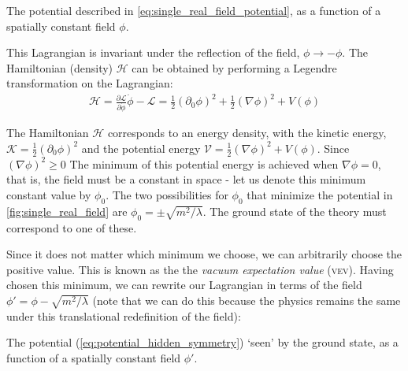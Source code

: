 \begin{marginfigure}
\caption{The potential described in \autoref{eq:single_real_field_potential}, as a function of a spatially constant field $\phi$.}
\label{fig:single_real_field}
\end{marginfigure}

This Lagrangian is invariant under the reflection of the field, $\phi\rightarrow -\phi$. The Hamiltonian (density) $\mathcal{H}$ can be obtained by performing a Legendre transformation on the Lagrangian:
\begin{align}
\mathcal{H} = \frac{\partial\mathcal{L}}{\partial\dot{\phi}}\dot{\phi} - \mathcal{L} = \frac{1}{2}(\partial_0\phi)^2+ \frac{1}{2}(\nabla\phi)^2+ V(\phi)
\end{align}

The Hamiltonian $\mathcal{H}$ corresponds to an energy density, with the kinetic energy, $\mathcal{K} = \frac{1}{2}(\partial_0\phi)^2$ and the potential energy $\mathcal{V} = \frac{1}{2}(\nabla\phi)^2 + V(\phi)$. Since $(\nabla\phi)^2 \geq 0$ The minimum of this potential energy is achieved when $\nabla\phi = 0$, that is, the field must be a constant in space - let us denote this minimum constant value by $\phi_0$. The two possibilities for $\phi_0$ that minimize the potential in \autoref{fig:single_real_field} are $\phi_0 = \pm\sqrt{m^2/\lambda}$. The ground state of the theory must correspond to one of these.

Since it does not matter which minimum we choose, we can arbitrarily choose the positive value. This is known as the the \emph{vacuum expectation value} (\textsc{vev}). Having chosen this minimum, we can rewrite our Lagrangian in terms of the field $\phi' = \phi - \sqrt{m^2/\lambda}$ (note that we can do this because the physics remains the same under this translational redefinition of the field):
\begin{marginfigure}
\caption{The potential (\autoref{eq:potential_hidden_symmetry}) `seen' by the ground state, as a function of a spatially constant field $\phi'$.}
\label{fig:hidden_symmetry}
\end{marginfigure}

